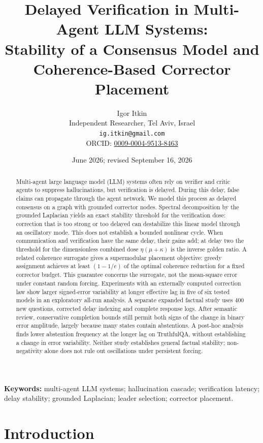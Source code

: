 \documentclass[11pt]{article}
\title{\bf Delayed Verification in Multi-Agent LLM Systems:\\
Stability of a Consensus Model and Coherence-Based Corrector Placement}
\author{Igor Itkin\\
\small Independent Researcher, Tel Aviv, Israel\\
\small \texttt{ig.itkin@gmail.com}\\
\small ORCID: \href{https://orcid.org/0009-0004-9513-8463}{0009-0004-9513-8463}}
\date{June 2026; revised September 16, 2026}
\theoremstyle{definition}
\begin{document}
\maketitle

\begin{abstract}
Multi-agent large language model (LLM) systems often rely on verifier and critic agents to suppress hallucinations, but
verification is delayed. During this delay, false claims can propagate through the agent network. We
model this process as delayed consensus on a graph with grounded corrector nodes. Spectral decomposition
by the grounded Laplacian yields an exact stability threshold for the verification dose: correction
that is too strong or too delayed can destabilize this linear model through an oscillatory mode.
This does not establish a bounded nonlinear cycle. When communication and
verification have the same delay, their gains add; at delay two the threshold for the dimensionless
combined dose $\eta(\mu+\kappa)$ is the inverse golden ratio. A related coherence surrogate gives a supermodular placement objective: greedy
assignment achieves at least $(1-1/e)$ of the optimal coherence reduction for a fixed corrector budget.
This guarantee concerns the surrogate, not the mean-square error under constant random forcing. Experiments
with an externally computed correction law show larger signed-error variability at longer effective
lag in five of six tested models in an exploratory all-run analysis. A separate expanded factual
study uses $400$ new questions, corrected delay indexing and complete response logs. After semantic
review, conservative completion bounds still permit both signs of the change in binary error
amplitude, largely because many states contain abstentions. A post-hoc analysis finds lower
abstention frequency at the longer lag on TruthfulQA, without establishing a change in error
variability. Neither study establishes general factual stability; non-negativity alone does not
rule out oscillations under persistent forcing.
\end{abstract}

\medskip
\noindent\textbf{Keywords:} multi-agent LLM systems; hallucination cascade; verification latency;
delay stability; grounded Laplacian; leader selection; corrector
placement.

\section{Introduction}
\end{document}
